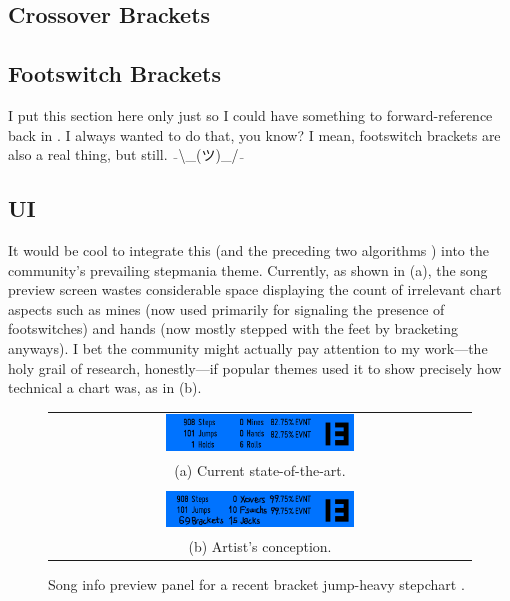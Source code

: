 \documentclass[10pt]{sigplanconf}
\begin{document}
\subsection{Crossover Brackets}
\label{sec:xover-brackers}

\subsection{Footswitch Brackets}
\label{sec:fs-brackers}

I put this section here only just so I could have something to forward-reference back in .
I always wanted to do that, you know?
I mean, footswitch brackets are also a real thing, but still. $\bar{~~}$\textbackslash\_(ツ)\_/$\bar{~~}$

\subsection{UI}

It would be cool to integrate this (and the preceding two algorithms \cite{turniness,crossoveriness})
into
the community's prevailing stepmania theme.
Currently, as shown in (a),
the song preview screen wastes considerable space displaying the count of irrelevant chart aspects
such as mines (now used primarily for signaling the presence of footswitches)
and hands (now mostly stepped with the feet by bracketing anyways).
I bet the community might actually pay attention to my work---the holy grail of research, honestly---if
popular themes used it to show precisely how technical a chart was, as in (b).

\begin{figure}[t]
	\begin{tabular}{c}
	\includegraphics[width=0.46\textwidth]{song-info.png} \\
		(a) Current state-of-the-art.
		\\
		\\
	\includegraphics[width=0.46\textwidth]{song-info-better.png} \\
		(b) Artist's conception.
	\end{tabular}
	\caption{Song info preview panel for a recent bracket jump-heavy stepchart \cite{divine}.}
	\label{fig:songpreview}
\end{figure}
\end{document}
